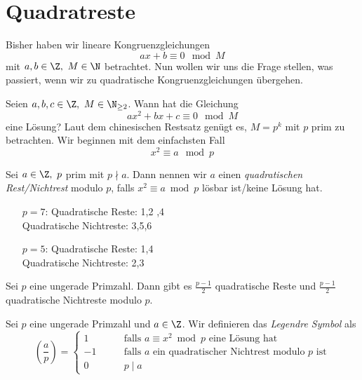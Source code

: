 \chapter{Quadratreste}

Bisher haben wir lineare Kongruenzgleichungen 
\[ ax+b \equiv 0 \mod M \]
mit $a,b \in \Z,\ M \in \N$ betrachtet. Nun wollen wir uns die Frage stellen, was passiert, wenn wir zu quadratische Kongruenzgleichungen übergehen.

Seien $a,b,c \in \Z,\ M \in \N_{\geq 2}$. Wann hat die Gleichung
\[ ax^2 + bx + c \equiv 0 \mod M \]
eine Lösung? Laut dem chinesischen Restsatz genügt es, $M= p^k$ mit $p$ prim zu betrachten. Wir beginnen mit dem einfachsten Fall
\[ x^2 \equiv a \mod p \]

\begin{defn*} 
	Sei $a \in \Z,\ p$ prim mit $p \nmid a$. Dann nennen wir $a$ einen \emph{quadratischen Rest/Nichtrest} modulo $p$, falls $x^2 \equiv a \bmod p$ lösbar ist/keine Lösung hat.
\end{defn*}

\begin{exmp*}
	\begin{itemize}
		\item[$p=7$:] Quadratische Reste: 1,2 ,4\\
		Quadratische Nichtreste: 3,5,6
		\item[$p=5$:] Quadratische Reste: 1,4\\
		Quadratische Nichtreste: 2,3
	\end{itemize}
\end{exmp*}

\begin{thm}\autolabel
	Sei $p$ eine ungerade Primzahl. Dann gibt es $\frac{p-1}{2}$ quadratische Reste und $\frac{p-1}{2}$ quadratische Nichtreste modulo $p$.
\end{thm}
\pagebreak
\begin{defn*}
	Sei $p$ eine ungerade Primzahl und $a \in \Z$. Wir definieren das \emph{Legendre Symbol} als\video
	\[ \left( \frac{a}{p} \right) = \begin{cases}
		1 \qquad &\text{falls $a \equiv x^2 \bmod p$ eine Lösung hat}\\
		-1 \qquad &\text{falls $a$ ein quadratischer Nichtrest modulo $p$ ist}\\
		0 \qquad &p \mid a
	\end{cases} \]
\end{defn*}

